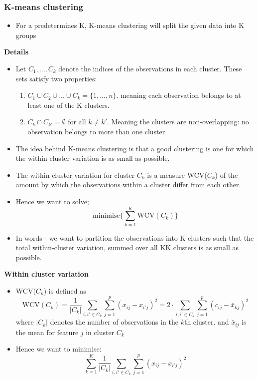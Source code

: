\documentclass{article}
\begin{document}
\subsubsection{K-means clustering}

\begin{itemize}
    \item For a predetermines K, K-means clustering will split the given data into K groups
\end{itemize}

\noindent\textbf{Details}

\begin{itemize}
    \item Let $C_1, ..., C_k$ denote the indices of the observations in each cluster. These sets satisfy two properties:
    \begin{enumerate}
        \item $C_1 \cup C_2 \cup ... \cup C_k = \{1,...,n\}$. meaning each observation belongs to at least one of the K clusters.
        \item $C_k \cap C_{k'} = \emptyset$ for all $k \neq k'$. Meaning the clusters are non-overlapping: no observation belongs to more than one cluster.
    \end{enumerate}
    \item The idea behind K-means clustering is that a good clustering is one for which the within-cluster variation is as small as possible.
    \item The within-cluster variation for cluster $C_k$ is a measure WCV($C_k$) of the amount by which the observations within a cluster differ from each other.
    \item Hence we want to solve;
    \begin{equation*}
        \text{minimise}\{\sum_{k=1}^K \text{WCV}(C_k)\}
    \end{equation*}
    \item In words - we want to partition the observations into K clusters such that the total within-cluster variation, summed over all KK clusters is as small as possible.
\end{itemize}



\noindent \textbf{Within cluster variation}

\begin{itemize}
    \item WCV($C_k$) is defined as
    \begin{equation*}
        \text{WCV}(C_k) = \frac{1}{|C_k|}\sum_{i, i' \in C_k} \sum_{j=1}^p (x_{ij} - x_{i'j})^2 = 2 \cdot \sum_{i, i' \in C_k} \sum_{j=1}^p (c_{ij} - \bar{x}_{kj})^2
    \end{equation*}
    where $|C_k|$ denotes the number of observations in the $k$th cluster. and $\bar{x}_{ij}$ is the mean for feature $j$ in cluster $C_k$
    \item Hence we want to minimise:
    \begin{equation*}
        \sum_{k=1}^K \frac{1}{|C_k|}\sum_{i, i' \in C_k} \sum_{j=1}^p (x_{ij} - x_{i'j})^2
    \end{equation*}
\end{itemize}
\end{document}
